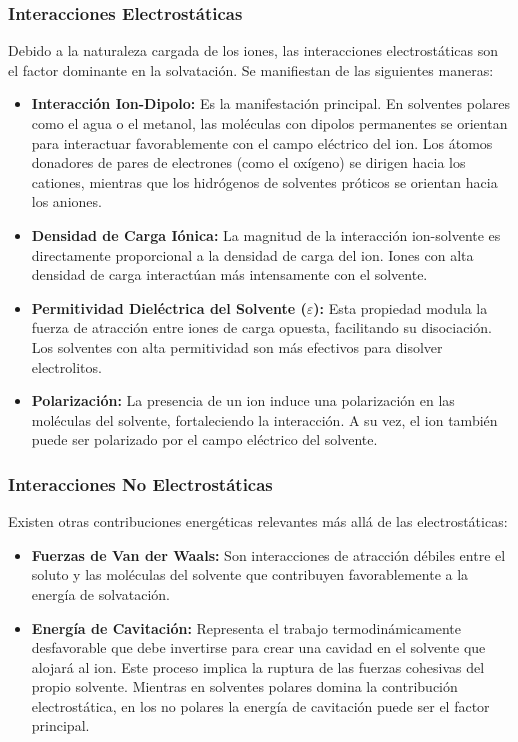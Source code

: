 \subsubsection{Interacciones Electrostáticas}
Debido a la naturaleza cargada de los iones, las interacciones electrostáticas son el factor dominante en la solvatación. Se manifiestan de las siguientes maneras:
\begin{itemize}
    \item \textbf{Interacción Ion-Dipolo:} Es la manifestación principal. En solventes polares como el agua o el metanol, las moléculas con dipolos permanentes se orientan para interactuar favorablemente con el campo eléctrico del ion. Los átomos donadores de pares de electrones (como el oxígeno) se dirigen hacia los cationes, mientras que los hidrógenos de solventes próticos se orientan hacia los aniones.
    \item \textbf{Densidad de Carga Iónica:} La magnitud de la interacción ion-solvente es directamente proporcional a la densidad de carga del ion. Iones con alta densidad de carga interactúan más intensamente con el solvente.
    \item \textbf{Permitividad Dieléctrica del Solvente ($\varepsilon$):} Esta propiedad modula la fuerza de atracción entre iones de carga opuesta, facilitando su disociación. Los solventes con alta permitividad son más efectivos para disolver electrolitos.
    \item \textbf{Polarización:} La presencia de un ion induce una polarización en las moléculas del solvente, fortaleciendo la interacción. A su vez, el ion también puede ser polarizado por el campo eléctrico del solvente.
\end{itemize}

\subsubsection{Interacciones No Electrostáticas}
Existen otras contribuciones energéticas relevantes más allá de las electrostáticas:
\begin{itemize}
    \item \textbf{Fuerzas de Van der Waals:} Son interacciones de atracción débiles entre el soluto y las moléculas del solvente que contribuyen favorablemente a la energía de solvatación.
    \item \textbf{Energía de Cavitación:} Representa el trabajo termodinámicamente desfavorable que debe invertirse para crear una cavidad en el solvente que alojará al ion. Este proceso implica la ruptura de las fuerzas cohesivas del propio solvente. Mientras en solventes polares domina la contribución electrostática, en los no polares la energía de cavitación puede ser el factor principal.
\end{itemize}

